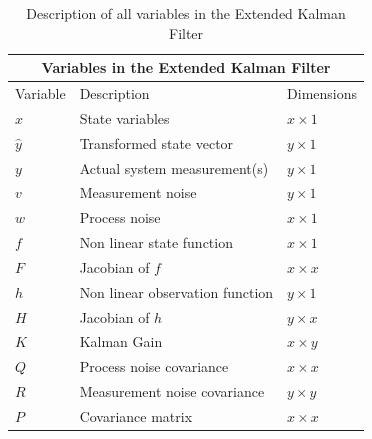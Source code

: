 \begin{center}
\begin{table}[h]
\centering
\caption{Description of all variables in the Extended Kalman Filter} \label{tab:sometab}
\begin{tabular}{ |p{2cm}||p{5cm}|p{2cm}| }
    \hline
    \multicolumn{3}{|c|}{Variables in the Extended Kalman Filter } \\ 
    \hline
    Variable & Description & Dimensions \\
    \hline
    $x$ & State variables  & $x \times 1$ \\
    $\hat y$ & Transformed state vector  & $y \times 1$ \\
    $y$ & Actual system measurement(s) & $y \times 1$ \\
    $v$ & Measurement noise & $y \times 1$\\
    $w$ & Process noise & $x \times 1$\\
    $f$ & Non linear state function  & $x \times 1 $  \\ 
    $F$ & Jacobian of $f$  & $x \times x $  \\ 
    $h$ & Non linear observation function & $y \times 1$\\
    $H$ & Jacobian of $h$ & $y \times x$\\
    $K$ & Kalman Gain  & $x \times y$\\
    $Q$ & Process noise covariance  & $x \times x$ \\
    $R$ & Measurement noise covariance &  $y \times y$\\
    $P$ & Covariance matrix & $x \times x $  \\ 
    \hline
\end{tabular}
\end{table}
\label{tab:EKF}
\end{center}
